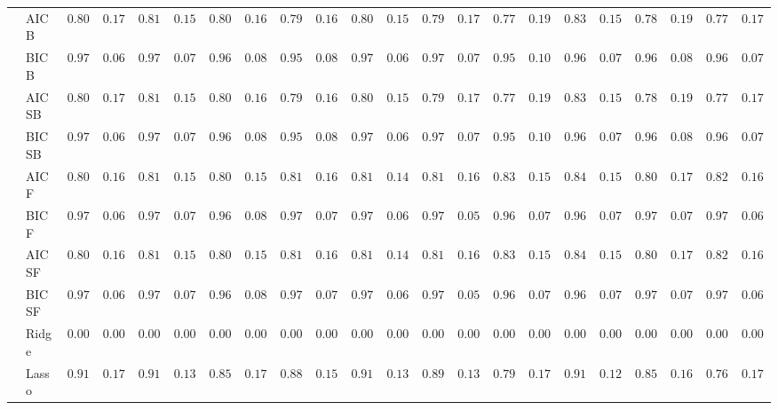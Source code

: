 \begin{tabular}{p{0.2cm}p{1cm}|p{0.6cm}p{0.6cm}|p{0.6cm}p{0.6cm}p{0.6cm}p{0.6cm}p{0.6cm}p{0.6cm}|p{0.6cm}p{0.6cm}p{0.6cm}p{0.6cm}p{0.6cm}p{0.6cm}|p{0.6cm}p{0.6cm}p{0.6cm}p{0.6cm}p{0.6cm}p{0.6cm}}
 & AIC B  & $0.8017$ & $0.1752$ & $0.8150$ & $0.1587$ & $0.8033$ & $0.1613$ & $0.7950$ & $0.1639$ & $0.8017$ & $0.1584$ & $0.7917$ & $0.1731$ & $0.7783$ & $0.1925$ & $0.8333$ & $0.1553$ & $0.7817$ & $0.1905$ & $0.7750$ & $0.1731$ \\
 & BIC B  & $0.9717$ & $0.0672$ & $0.9717$ & $0.0713$ & $0.9650$ & $0.0864$ & $0.9583$ & $0.0898$ & $0.9700$ & $0.0686$ & $0.9717$ & $0.0713$ & $0.9500$ & $0.1019$ & $0.9650$ & $0.0796$ & $0.9633$ & $0.0840$ & $0.9650$ & $0.0796$ \\
 & AIC SB  & $0.8017$ & $0.1752$ & $0.8150$ & $0.1587$ & $0.8033$ & $0.1613$ & $0.7950$ & $0.1639$ & $0.8017$ & $0.1584$ & $0.7917$ & $0.1731$ & $0.7783$ & $0.1925$ & $0.8333$ & $0.1553$ & $0.7817$ & $0.1905$ & $0.7750$ & $0.1731$ \\
 & BIC SB  & $0.9717$ & $0.0672$ & $0.9717$ & $0.0713$ & $0.9650$ & $0.0864$ & $0.9583$ & $0.0898$ & $0.9700$ & $0.0686$ & $0.9717$ & $0.0713$ & $0.9500$ & $0.1019$ & $0.9650$ & $0.0796$ & $0.9633$ & $0.0840$ & $0.9650$ & $0.0796$ \\
 & AIC F  & $0.8050$ & $0.1659$ & $0.8150$ & $0.1587$ & $0.8067$ & $0.1584$ & $0.8133$ & $0.1680$ & $0.8100$ & $0.1499$ & $0.8167$ & $0.1615$ & $0.8300$ & $0.1553$ & $0.8400$ & $0.1552$ & $0.8083$ & $0.1714$ & $0.8217$ & $0.1663$ \\
 & BIC F  & $0.9717$ & $0.0672$ & $0.9717$ & $0.0713$ & $0.9650$ & $0.0864$ & $0.9717$ & $0.0713$ & $0.9700$ & $0.0686$ & $0.9783$ & $0.0563$ & $0.9650$ & $0.0796$ & $0.9683$ & $0.0738$ & $0.9700$ & $0.0726$ & $0.9750$ & $0.0643$ \\
 & AIC SF  & $0.8050$ & $0.1659$ & $0.8150$ & $0.1587$ & $0.8067$ & $0.1584$ & $0.8133$ & $0.1680$ & $0.8100$ & $0.1499$ & $0.8167$ & $0.1615$ & $0.8317$ & $0.1526$ & $0.8400$ & $0.1552$ & $0.8083$ & $0.1714$ & $0.8233$ & $0.1638$ \\
 & BIC SF  & $0.9717$ & $0.0672$ & $0.9717$ & $0.0713$ & $0.9650$ & $0.0864$ & $0.9717$ & $0.0713$ & $0.9700$ & $0.0686$ & $0.9783$ & $0.0563$ & $0.9667$ & $0.0786$ & $0.9683$ & $0.0738$ & $0.9700$ & $0.0726$ & $0.9750$ & $0.0643$ \\
 & Ridge  & $0.0000$ & $0.0000$ & $0.0000$ & $0.0000$ & $0.0000$ & $0.0000$ & $0.0000$ & $0.0000$ & $0.0000$ & $0.0000$ & $0.0000$ & $0.0000$ & $0.0000$ & $0.0000$ & $0.0000$ & $0.0000$ & $0.0000$ & $0.0000$ & $0.0000$ & $0.0000$ \\
 & Lasso  & $0.9167$ & $0.1733$ & $0.9133$ & $0.1371$ & $0.8583$ & $0.1747$ & $0.8817$ & $0.1541$ & $0.9183$ & $0.1329$ & $0.8917$ & $0.1369$ & $0.7917$ & $0.1794$ & $0.9183$ & $0.1265$ & $0.8567$ & $0.1642$ & $0.7633$ & $0.1791$ \\

\end{tabular}
